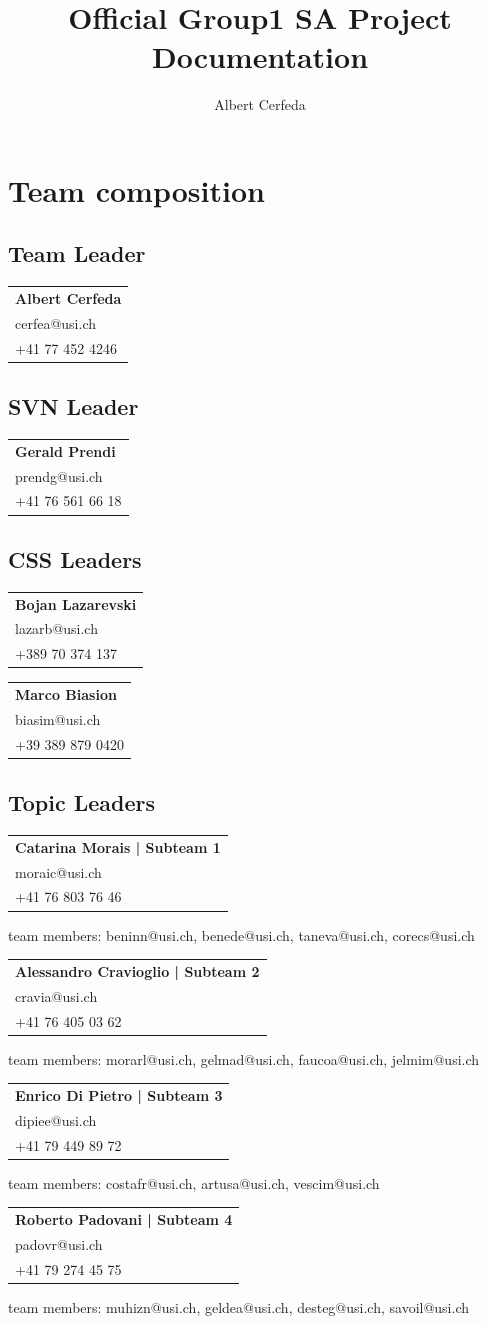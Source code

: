 \documentclass[a4paper,10pt]{article}
\title{Official Group1 SA Project Documentation}
\author{Albert Cerfeda}
\date{}
\newcommand{\idcard}[3]{
    \vspace{-0.3cm}
    \begin{table}[h!]
     \begin{tabular}{|l|}
        \hline
        \textbf{#1} \\
        #2 \\
        #3\\
        \hline
     \end{tabular}
    \end{table}
    \vspace{-0.3cm}
}
\begin{document}
\maketitle
\tableofcontents
\newpage

\section{Team composition}

    \subsection{Team Leader}
        \idcard{Albert Cerfeda}{cerfea@usi.ch}{+41 77 452 4246}
    \subsection{SVN Leader}
        \idcard{Gerald Prendi}{prendg@usi.ch}{+41 76 561 66 18}
        
    \subsection{CSS Leaders}
        \idcard{Bojan Lazarevski}{lazarb@usi.ch}{+389 70 374 137}
        \idcard{Marco Biasion}{biasim@usi.ch}{+39 389 879 0420}
        
    \subsection{Topic Leaders}
        \label{topicleaders}
        \idcard{Catarina Morais | \textbf{Subteam 1}}{moraic@usi.ch}{+41 76 803 76 46}
        team members: beninn@usi.ch, benede@usi.ch, taneva@usi.ch, corecs@usi.ch\newline
        
        \idcard{Alessandro Cravioglio | \textbf{Subteam 2}}{cravia@usi.ch}{+41 76 405 03 62}
        team members: morarl@usi.ch, gelmad@usi.ch, faucoa@usi.ch, jelmim@usi.ch\newline 
        
        \idcard{Enrico Di Pietro | \textbf{Subteam 3}}{dipiee@usi.ch}{+41 79 449 89 72}
        team members: costafr@usi.ch, artusa@usi.ch, vescim@usi.ch\newline
        
        \idcard{Roberto Padovani | \textbf{Subteam 4}}{padovr@usi.ch}{+41 79 274 45 75}
        team members: muhizn@usi.ch, geldea@usi.ch, desteg@usi.ch, savoil@usi.ch\newline
        
\end{document}
